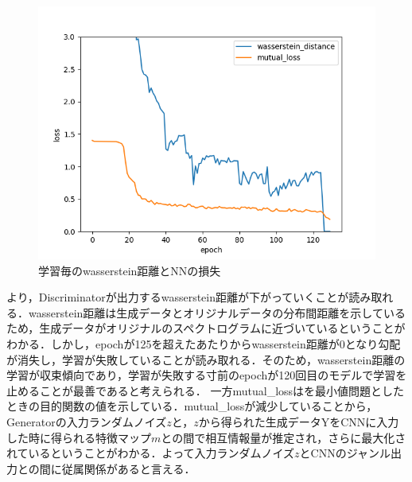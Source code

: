 \begin{figure}[htbp]
	\begin{center}
		\includegraphics[scale=0.55]{./images/generate-model/lossmutual_gan_2.png}
		\caption{学習毎のwasserstein距離とNNの損失}
		\label{fig:wasserstein-loss}
	\end{center}
\end{figure}

より，Discriminatorが出力するwasserstein距離が下がっていくことが読み取れる．wasserstein距離は生成データとオリジナルデータの分布間距離を示しているため，生成データがオリジナルのスペクトログラムに近づいているということがわかる．しかし，epochが125を超えたあたりからwasserstein距離が0となり勾配が消失し，学習が失敗していることが読み取れる．そのため，wasserstein距離の学習が収束傾向であり，学習が失敗する寸前のepochが120回目のモデルで学習を止めることが最善であると考えられる．
一方mutual\_lossはを最小値問題としたときの目的関数の値を示している．mutual\_lossが減少していることから，Generatorの入力ランダムノイズ$z$と，$z$から得られた生成データYをCNNに入力した時に得られる特徴マップ$m$との間で相互情報量が推定され，さらに最大化されているということがわかる．よって入力ランダムノイズ$z$とCNNのジャンル出力との間に従属関係があると言える．

\clearpage
